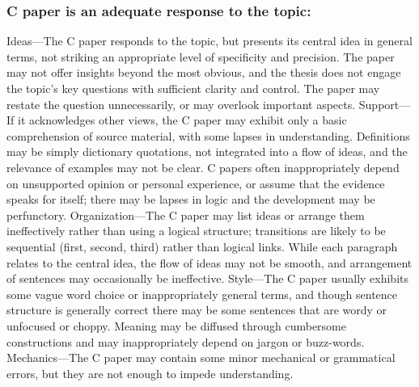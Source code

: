 \documentclass{article}
\begin{document}
\subsubsection{C paper is an adequate response to the topic:}
Ideas---The C paper responds to the topic, but presents its central idea in general terms, not striking an appropriate level of specificity and precision. The paper may not offer insights beyond the most obvious, and the thesis does not engage the topic's key questions with sufficient clarity and control. The paper may restate the question unnecessarily, or may overlook important aspects. Support---If it acknowledges other views, the C paper may exhibit only a basic comprehension of source material, with some lapses in understanding. Definitions may be simply dictionary quotations, not integrated into a flow of ideas, and the relevance of examples may not be clear. C papers often inappropriately depend on unsupported opinion or personal experience, or assume that the evidence speaks for itself; there may be lapses in logic and the development may be perfunctory. Organization---The C paper may list ideas or arrange them ineffectively rather than using a logical structure; transitions are likely to be sequential (first, second, third) rather than logical links. While each paragraph relates to the central idea, the flow of ideas may not be smooth, and arrangement of sentences may occasionally be ineffective. Style---The C paper usually exhibits some vague word choice or inappropriately general terms, and though sentence structure is generally correct there may be some sentences that are wordy or unfocused or choppy. Meaning may be diffused through cumbersome constructions and may inappropriately depend on jargon or buzz-words. Mechanics---The C paper may contain some minor mechanical or grammatical errors, but they are not enough to impede understanding.
\end{document}
